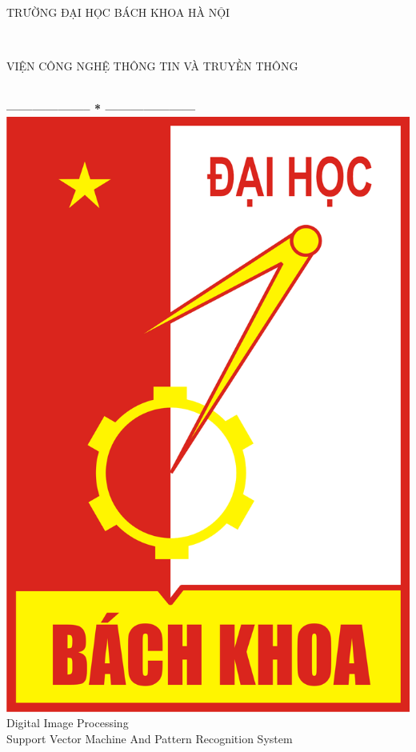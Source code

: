 \documentclass[12pt,a4paper]{article}
\begin{document}
\thispagestyle{empty}
\thisfancypage{
\setlength{\fboxsep}{0pt}
\fbox}{}
\begin{center}
\begin{large}
TRƯỜNG ĐẠI HỌC BÁCH KHOA HÀ NỘI
\end{large} \\
\begin{large}
VIỆN CÔNG NGHỆ THÔNG TIN VÀ TRUYỀN THÔNG
\end{large} \\

\textbf{--------------------  *  ---------------------}\\[1.5cm]
\includegraphics[scale=0.35]{12}
\\
\vspace{2cm}
{\fontsize{25pt}{1}\selectfont Digital Image Processing}\\[1cm]
{\fontsize{15pt}{1}\selectfont Support Vector Machine And Pattern Recognition System}\\[3cm]
\end{center}
\end{document}
